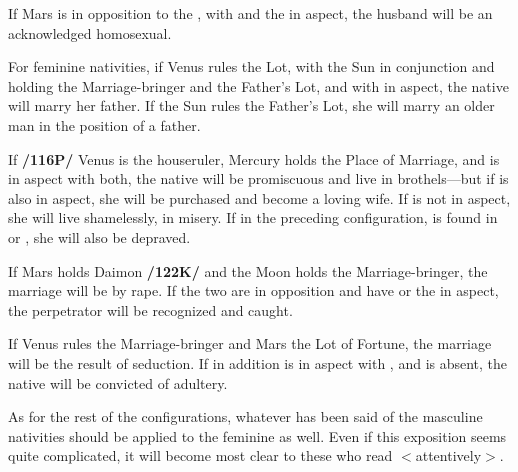 If Mars is in opposition to the \Moon, with \Saturn\xspace and the \Sun\xspace in aspect, the husband will be an acknowledged homosexual. 

For feminine nativities, if Venus rules the Lot, with the Sun in conjunction and holding the Marriage-bringer and the Father’s Lot, and with \Saturn\xspace in aspect, the native will marry her father. If the Sun rules the Father’s Lot, she will marry an older man in the position of a father. 

If \textbf{/116P/} Venus is the houseruler, Mercury holds the Place of Marriage, and \Saturn\xspace is in aspect with both, the native will be
promiscuous and live in brothels—but if \Jupiter\xspace is also in aspect, she will be purchased and become a loving wife. If \Jupiter\xspace is not in aspect, she will live shamelessly, in misery.  If in the preceding configuration, \Venus\xspace is found in \Pisces\xspace or \Capricorn, she will also be depraved. 

If Mars holds Daimon \textbf{/122K/} and the Moon holds the Marriage-bringer, the marriage will be by rape. If the two are in opposition and have \Saturn\xspace or the \Sun\xspace in aspect, the perpetrator will be recognized and caught. 

If Venus rules the Marriage-bringer and Mars the Lot of Fortune, the marriage will be the result of seduction. If in addition \Saturn\xspace is in aspect with \Mercury, and \Jupiter\xspace is absent, the native will be convicted of adultery.

As for the rest of the configurations, whatever has been said of the masculine nativities should be applied to the feminine as well. Even if this exposition seems quite complicated, it will become most clear to these who read $<$attentively$>$.

\newpage